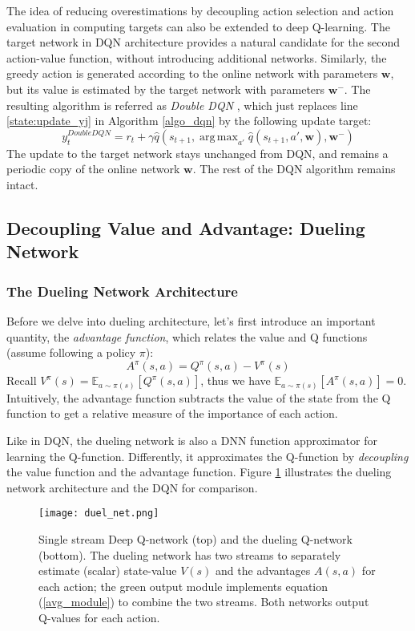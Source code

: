 \documentclass{article}
\newcommand{\E}{\mathbb{E}}                                        %
\newcommand{\w}{\mathbf{w}}
\DeclareMathOperator*{\argmax}{arg\,max}
\begin{document}
The idea of reducing overestimations by decoupling action selection and action evaluation in computing targets can also be extended to deep Q-learning. The target network in DQN architecture provides a natural candidate for the second action-value function, without introducing additional networks. Similarly, the greedy action is generated according to the online network with parameters $\w$, but its value is estimated by the target network with parameters $\w^-$. The resulting algorithm is referred as \textit{Double DQN} \cite{ref_DDQN}, which just replaces line \ref{state:update_yj} in Algorithm \ref{algo_dqn} by the following update target:
\begin{equation} \label{target_ddqn}
y_t^{DoubleDQN} = r_t + \gamma \hat{q}(s_{t+1}, \argmax_{a'} \hat{q}(s_{t+1}, a', \w), \w^-)
\end{equation}
The update to the target network stays unchanged from DQN, and remains a periodic copy of the online network $\w$. The rest of the DQN algorithm remains intact.

\subsection{Decoupling Value and Advantage: Dueling Network \cite{ref_DuelingDQN}}
\subsubsection{The Dueling Network Architecture}
Before we delve into dueling architecture, let's first introduce an important quantity, the \textit{advantage function}, which relates the value and Q functions (assume following a policy $\pi$):
\begin{equation} \label{advantage}
A^{\pi}(s,a) = Q^{\pi} (s,a) - V^\pi (s)
\end{equation}
Recall $V^\pi (s) = \E_{a \sim \pi(s)} [Q^\pi (s,a)] $, thus we have  $\E_{a \sim \pi(s)} [A^{\pi}(s,a)] = 0$. Intuitively, the advantage function subtracts the value of the state from the Q function to get a relative measure of the importance of each action.

Like in DQN, the dueling network is also a DNN function approximator for learning the Q-function. Differently, it approximates the Q-function by \textit{decoupling} the value function and the advantage function. Figure \ref{fig_duelNet} illustrates the dueling network architecture and the DQN for comparison.

\begin{figure}
    \centering
    \texttt{[image: duel\_net.png]}
     \caption{Single stream Deep Q-network (top) and the dueling Q-network (bottom). The dueling network has two streams to separately estimate (scalar) state-value $V(s)$ and the advantages $A(s,a)$ for each action; the green output module implements equation (\ref{avg_module}) to combine the two streams. Both networks output Q-values for each action.}
     \label{fig_duelNet}
 \end{figure}
\end{document}

